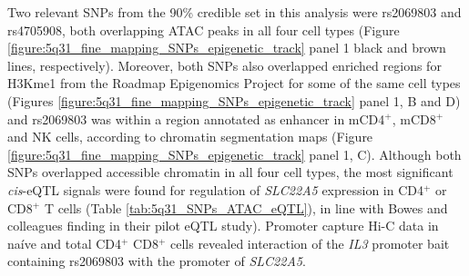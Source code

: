 Two relevant SNPs from the 90\% credible set in this analysis were rs2069803 and rs4705908, both overlapping ATAC peaks in all four cell types (Figure \ref{figure:5q31_fine_mapping_SNPs_epigenetic_track} panel 1 black and brown lines, respectively). Moreover, both SNPs also overlapped enriched regions for H3Kme1 from the Roadmap Epigenomics Project for some of the same cell types (Figures \ref{figure:5q31_fine_mapping_SNPs_epigenetic_track} panel 1, B and D) and rs2069803 was within a region annotated as enhancer in mCD4$^+$, mCD8$^+$ and NK cells, according to chromatin segmentation maps (Figure \ref{figure:5q31_fine_mapping_SNPs_epigenetic_track} panel 1, C). Although both SNPs overlapped accessible chromatin in all four cell types, the most significant \textit{cis}-eQTL signals were found for regulation of \textit{SLC22A5} expression in CD4$^+$ or CD8$^+$ T cells (Table \ref{tab:5q31_SNPs_ATAC_eQTL}), in line with Bowes and colleagues finding in their pilot eQTL study). Promoter capture Hi-C data in na\'{i}ve and total CD4$^+$ CD8$^+$ cells revealed interaction of the \textit{IL3} promoter bait containing rs2069803 with the promoter of \textit{SLC22A5}.




